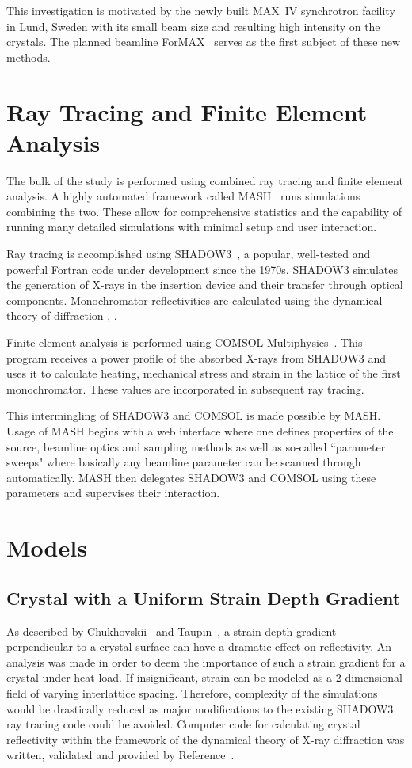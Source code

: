\documentclass{iucr}
\begin{document}
This investigation is motivated by the newly built MAX~IV synchrotron facility in Lund, Sweden with its small beam size and resulting high intensity on the crystals. The planned beamline ForMAX~\cite{formax} serves as the first subject of these new methods.

\section{Ray Tracing and Finite Element Analysis}

The bulk of the study is performed using combined ray tracing and finite element analysis. A highly automated framework called MASH~\cite{mash} runs simulations combining the two. These allow for comprehensive statistics and the capability of running many detailed simulations with minimal setup and user interaction.

Ray tracing is accomplished using SHADOW3~\cite{shadow3}, a popular, well-tested and powerful Fortran code under development since the 1970s. SHADOW3 simulates the generation of X-rays in the insertion device and their transfer through optical components. Monochromator reflectivities are calculated using the dynamical theory of diffraction \cite{dynamicaltheory}, \cite{asymmetricdiffraction}.

Finite element analysis is performed using COMSOL Multiphysics~\cite{comsol}. This program receives a power profile of the absorbed X-rays from SHADOW3 and uses it to calculate heating, mechanical stress and strain in the lattice of the first monochromator. These values are incorporated in subsequent ray tracing.

This intermingling of SHADOW3 and COMSOL is made possible by MASH. Usage of MASH begins with a web interface where one defines properties of the source, beamline optics and sampling methods as well as so-called ``parameter sweeps" where basically any beamline parameter can be scanned through automatically. MASH then delegates SHADOW3 and COMSOL using these parameters and supervises their interaction.

\section{Models}

\subsection{Crystal with a Uniform Strain Depth Gradient}\label{strain_gradient} 
As described by Chukhovskii~\cite{Chukhovskii} and Taupin~\cite{Taupin}, a strain depth gradient perpendicular to a crystal surface can have a dramatic effect on reflectivity. An analysis was made in order to deem the importance of such a strain gradient for a crystal under heat load. If insignificant, strain can be modeled as a 2-dimensional field of varying interlattice spacing. Therefore, complexity of the simulations would be drastically reduced as major modifications to the existing SHADOW3 ray tracing code could be avoided. Computer code for calculating crystal reflectivity within the framework of the dynamical theory of X-ray diffraction was written, validated and provided by Reference~\cite{coins}.
\end{document}
